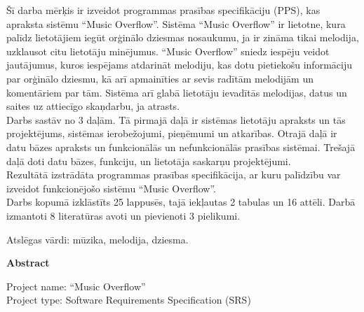 \documentclass[12pt]{article}
\begin{document}
Šī darba mērķis ir izveidot programmas prasības specifikāciju (PPS), kas apraksta sistēmu ``Music Overflow''.
Sistēma ``Music Overflow'' ir lietotne, kura palīdz lietotājiem iegūt orģinālo dziesmas nosaukumu, ja ir zināma tikai melodija, uzklausot citu lietotāju minējumus. ``Music Overflow'' sniedz iespēju veidot jautājumus, kuros iespējams atdarināt melodiju, kas dotu pietiekošu informāciju par orģinālo dziesmu, kā arī apmainīties ar sevis radītām melodijām un komentāriem par tām. Sistēma arī glabā lietotāju ievadītās melodijas, datus un saites uz attiecīgo skaņdarbu, ja atrasts. \\
\indent Darbs sastāv no 3 daļām. Tā pirmajā daļā ir sistēmas lietotāju apraksts un tās projektējums, sistēmas ierobežojumi, pieņēmumi un atkarības. Otrajā daļā ir datu bāzes apraksts un funkcionālās un nefunkcionālās prasības sistēmai. Trešajā daļā doti datu bāzes, funkciju, un lietotāja saskarņu projektējumi. \\
\indent Rezultātā izstrādāta programmas prasības specifikācija, ar kuru palīdzību var izveidot funkcionējošo sistēmu ``Music Overflow''. \\
\indent Darbs kopumā izklāstīts 25 lappusēs, tajā iekļautas 2 tabulas un 16 attēli.  Darbā izmantoti 8 literatūras avoti un pievienoti 3 pielikumi.

Atslēgas vārdi: mūzika, melodija, dziesma.

\pagebreak

\begin{center}
\textbf{\large Abstract}\\
\end{center}

\indent Project name: ``Music Overflow''\\
\indent Project type: Software Requirements Specification (SRS)\\
\end{document}

